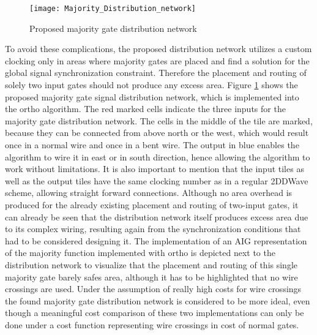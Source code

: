\begin{figure}
	\centering
	\texttt{[image: Majority\_Distribution\_network]}
	\caption{Proposed majority gate distribution network}\label{fig:QCA_Maj_nw}
\end{figure}


To avoid these complications, the proposed distribution network utilizes a custom clocking only in areas where majority gates are placed and find a solution for the global signal synchronization constraint. Therefore the placement and routing of solely two input gates should not produce any excess area. Figure \ref{fig:QCA_Maj_nw} shows the proposed majority gate signal distribution network, which is implemented into the ortho algorithm. The red marked cells indicate the three inputs for the majority gate distribution network. The cells in the middle of the tile are marked, because they can be connected from above north or the west, which would result once in a normal wire and once in a bent wire. The output in blue enables the algorithm to wire it in east or in south direction, hence allowing the algorithm to work without limitations. It is also important to mention that the input tiles as well as the output tiles have the same clocking number as in a regular 2DDWave scheme, allowing straight forward connections. Although no area overhead is produced for the already existing placement and routing of two-input gates, it can already be seen that the distribution network itself produces excess area due to its complex wiring, resulting again from the synchronization conditions that had to be considered designing it. The implementation of an AIG representation of the majority function implemented with ortho is depicted next to the distribution network to visualize that the placement and routing of this single majority gate barely safes area, although it has to be highlighted that no wire crossings are used. Under the assumption of really high costs for wire crossings the found majority gate distribution network is considered to be more ideal, even though a meaningful cost comparison of these two implementations can only be done under a cost function representing wire crossings in cost of normal gates.
